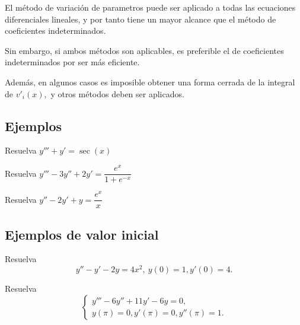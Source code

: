 \begin{rem}
	El m\'etodo de variaci\'on de parametros puede ser aplicado a todas las ecuaciones diferenciales lineales, y por tanto tiene un mayor alcance que el m\'etodo de coeficientes indeterminados.
	
	Sin embargo, si ambos m\'etodos son aplicables, es preferible el de coeficientes indeterminados por ser más eficiente.
	
	Además, en algunos casos es imposible obtener una forma cerrada de la integral de $v'_{i}(x),$ y otros m\'etodos deben ser aplicados.
\end{rem}



\subsection{Ejemplos}


\begin{problema}
	\label{bron:exmp:12.1}
	Resuelva $y'''+y'=\sec(x)$
\end{problema}




\begin{problema}
	\label{bron:12.2}
	Resuelva $y'''-3y''+2y'=\dfrac{e^{x}}{1+e^{-x}}$
\end{problema}




\begin{problema}
	\label{bron:12.3}
	Resuelva $y''-2y'+y=\dfrac{e^x}{x}$
\end{problema}



\subsection{Ejemplos de valor inicial}


\label{bron:13.1}
\begin{problema}
	Resuelva
	$$
	y''-y'-2y=4x^{2}, \ y(0)=1, y'(0)=4.
	$$
\end{problema}




\begin{problema}
	\label{bron:13.4}
	Resuelva
	$$\begin{cases}
		y'''-6y''+11y'-6y=0, \\
		y(\pi)=0, y'(\pi)=0, y''(\pi)=1.
	\end{cases}
	$$
\end{problema}




